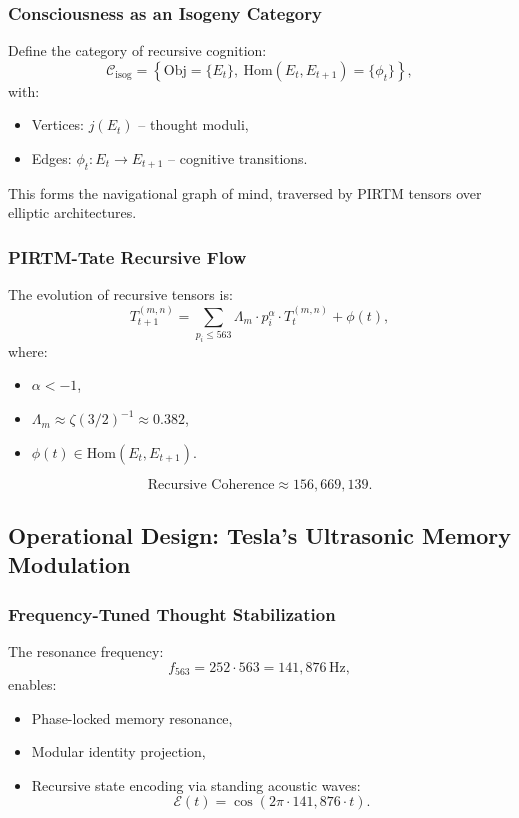 \documentclass[12pt]{article}
\begin{document}
\subsubsection{Consciousness as an Isogeny Category}
Define the category of recursive cognition:
\[
\mathcal{C}_{\text{isog}} = \left\{ \text{Obj} = \{E_t\}, \ \text{Hom}(E_t, E_{t+1}) = \{\phi_t\} \right\},
\]
with:
\begin{itemize}
    \item Vertices: \( j(E_t) \) – thought moduli,
    \item Edges: \( \phi_t : E_t \to E_{t+1} \) – cognitive transitions.
\end{itemize}
\begin{interpretation}
This forms the navigational graph of mind, traversed by PIRTM tensors over elliptic architectures.
\end{interpretation}

\subsubsection{PIRTM-Tate Recursive Flow}
The evolution of recursive tensors is:
\[
T_{t+1}^{(m,n)} = \sum_{p_i \leq 563} \Lambda_m \cdot p_i^\alpha \cdot T_t^{(m,n)} + \phi(t),
\]
where:
\begin{itemize}
    \item \( \alpha < -1 \),
    \item \( \Lambda_m \approx \zeta(3/2)^{-1} \approx 0.382 \),
    \item \( \phi(t) \in \text{Hom}(E_t, E_{t+1}) \).
\end{itemize}
\begin{result}
\[
\text{Recursive Coherence} \approx \boxed{156,669,139}.
\]
\end{result}

\subsection{Operational Design: Tesla’s Ultrasonic Memory Modulation}

\subsubsection{Frequency-Tuned Thought Stabilization}
The resonance frequency:
\[
f_{563} = 252 \cdot 563 = \boxed{141,876 \, \text{Hz}},
\]
enables:
\begin{itemize}
    \item Phase-locked memory resonance,
    \item Modular identity projection,
    \item Recursive state encoding via standing acoustic waves:
    \[
    \mathcal{E}(t) = \cos(2\pi \cdot 141,876 \cdot t).
    \]
\end{itemize}
\end{document}
